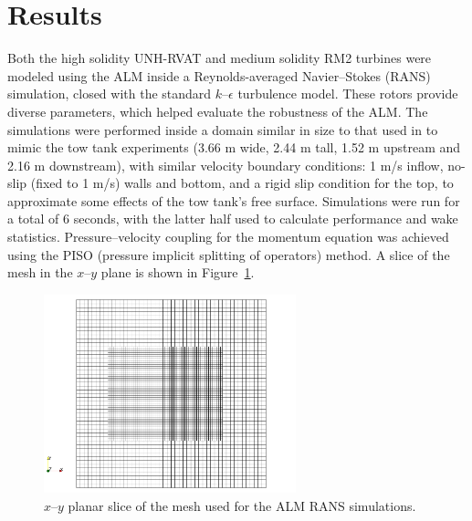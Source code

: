 \documentclass[times]{weauth}
\begin{document}
\section{Results}

Both the high solidity UNH-RVAT and medium solidity RM2 turbines were modeled
using the ALM inside a Reynolds-averaged Navier--Stokes (RANS) simulation,
closed with the standard $k$--$\epsilon$ turbulence model. These rotors provide
diverse parameters, which helped evaluate the robustness of the ALM. The
simulations were performed inside a domain similar in size to that used in
\cite{Bachant2016-BR-CFD} to mimic the tow tank experiments (3.66 m wide, 2.44 m
tall, 1.52 m upstream and 2.16 m downstream), with similar velocity boundary
conditions: 1 m/s inflow, no-slip (fixed to 1 m/s) walls and bottom, and a rigid
slip condition for the top, to approximate some effects of the tow tank's free
surface. Simulations were run for a total of 6 seconds, with the latter half
used to calculate performance and wake statistics. Pressure--velocity coupling
for the momentum equation was achieved using the PISO (pressure implicit
splitting of operators) method. A slice of the mesh in the $x$--$y$ plane is
shown in Figure~\ref{fig:ALM-mesh}.

\begin{figure}
    \centering

    \includegraphics[width=0.65\textwidth]{thesis_alm-mesh}

    \caption{$x$--$y$ planar slice of the mesh used for the ALM RANS
        simulations.}

    \label{fig:ALM-mesh}
\end{figure}
\end{document}
